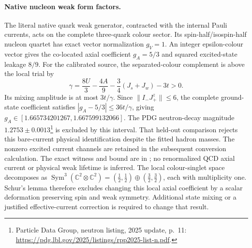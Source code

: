 \paragraph{Native nucleon weak form factors.}
The literal native quark weak generator, contracted with the internal
Pauli currents, acts on the complete three-quark colour sector. Its
spin-half/isospin-half nucleon quartet has exact vector normalization
$g_V=1$. An integer epsilon-colour vector gives the co-located axial
coefficient $g_A=5/3$ and squared excited-state leakage $8/9$.
For the calibrated source, the separated-colour complement is above the
local trial by
\[
 \gamma=\frac{8U}{3}-\frac{4A}{9}
       -\frac34(J_s+J_w)-3t>0.
\]
Its mixing amplitude is at most $3t/\gamma$. Since
$\|I_-J_+^z\|\leq6$, the complete ground-state coefficient satisfies
$|g_A-5/3|\leq36t/\gamma$, giving
$g_A\in[1.665734201267,1.667599132066]$.
The PDG neutron-decay magnitude $1.2753\pm0.0013$\footnote{Particle Data
Group, neutron listing, 2025 update, p.~11:
\url{https://pdg.lbl.gov/2025/listings/rpp2025-list-n.pdf}.}
is excluded by this
interval. That held-out comparison rejects this bare-current physical
identification despite the fitted hadron masses. The nonzero excited
current channels are retained in the subsequent conversion calculation.
The exact witness and bound are in
; no renormalized QCD axial
current or physical weak lifetime is inferred.
The local colour-singlet space decomposes as
$\operatorname{Sym}^3(\mathbb C^2\otimes\mathbb C^2)
=(\tfrac12,\tfrac12)\oplus(\tfrac32,\tfrac32)$, each with multiplicity
one. Schur's lemma therefore excludes changing this local axial
coefficient by a scalar deformation preserving spin and weak symmetry.
Additional state mixing or a justified effective-current correction is
required to change that result.
